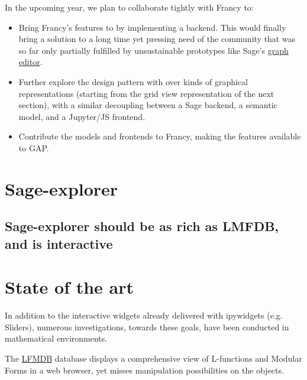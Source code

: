 \documentclass{deliverablereport}
\begin{document}
In the upcoming year, we plan to collaborate tightly with Francy to:
\begin{itemize}
\item Bring Francy's features to \Sage by implementing a backend. This
  would finally bring a solution to a long time yet pressing need of
  the community that was so far only partially fulfilled by
  unsustainable prototypes like Sage's
  \href{http://doc.sagemath.org/html/en/reference/graphs/sage/graphs/graph_editor.html}{graph editor}.
\item Further explore the design pattern with over kinds of graphical
  representations (starting from the grid view representation of the
  next section), with a similar decoupling between a Sage backend, a
  semantic model, and a Jupyter/JS frontend.
\item Contribute the models and frontends to Francy, making the
  features available to GAP.
\end{itemize}

\section{Sage-explorer}
\label{section:sage-explorer}


\subsection{Sage-explorer should be as rich as LMFDB, and is interactive}

\section{State of the art}

In addition to the interactive widgets already delivered with ipywidgets (e.g. Sliders), numerous investigations, towards these goals, have been conducted in mathematical environments.

The \href{http://www.lmfdb.org/}{LFMDB} database displays a
comprehensive view of L-functions and Modular Forms in a web browser,
yet misses manipulation possibilities on the objects.
\end{document}
